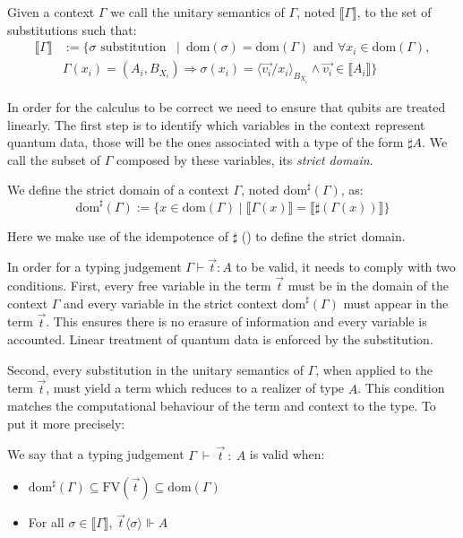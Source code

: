 \documentclass[runningheads,orivec,envcountsame,envcountsect]{llncs}
\newcommand\ansubst[2]{\ensuremath{\langle #1 \rangle_{#2}}}
\newcommand\dom[1]{\mathrm{dom}(#1)}
\newcommand\sdom[1]{\mathrm{dom}^{\sharp}(#1)}
\newcommand\FV[1]{\mathrm{FV}(#1)}
\def\sem#1{\llbracket#1\rrbracket}
\def\TYP#1#2#3{#1~{\vdash}~#2~{:}~#3}
\def\real{\Vdash}
\newcommand\basis[1]{\ensuremath{B_{ #1 }}}
\begin{document}
\begin{definition}
    Given a context $\Gamma$ we call the unitary semantics of $\Gamma$, noted $\sem{\Gamma}$, to the set of substitutions such that:
    \begin{align*}
      \sem{\Gamma} &:= 
      \{\sigma\text{ substitution }~\mid~ \dom{\sigma} = \dom{\Gamma}\text{ and } \forall {x_i} \in\dom{\Gamma},\\
      &\Gamma(x_i) = (A_i, \basis{X_i})\Rightarrow \sigma(x_i)=\ansubst{\vec{v_i}/x_i}{\basis{X_i}} \land \vec{v_i}\in\sem{A_i}\}
    \end{align*}
\end{definition}

In order for the calculus to be correct we need to ensure that qubits are treated linearly. The first step is to identify which variables in the context represent quantum data, those will be the ones associated with a type of the form $\sharp A$. We call the subset of $\Gamma$ composed by these variables, its \emph{strict domain}. 

\begin{definition}
    We define the strict domain of a context $\Gamma$, noted $\sdom{\Gamma}$, as:
    \[
    \sdom{\Gamma} := \{x\in\dom{\Gamma} \mid \sem{\Gamma(x)}=\sem{\sharp(\Gamma(x))}\}
    \]
\end{definition}

Here we make use of the idempotence of $\sharp$ () to define the strict domain. 

In order for a typing judgement $\Gamma\vdash \vec{t}: A$ to be valid, it needs to comply with two conditions. First, every free variable in the term $\vec{t}$ must be in the domain of the context $\Gamma$ and every variable in the strict context $\sdom{\Gamma}$ must appear in the term $\vec{t}$. This ensures there is no erasure of information and every variable is accounted. Linear treatment of quantum data is enforced by the substitution.

Second, every substitution in the unitary semantics of $\Gamma$, when applied to the term $\vec{t}$, must yield a term which reduces to a realizer of type $A$. This condition matches the computational behaviour of the term and context to the type. To put it more precisely: 

\begin{definition}
    We say that a typing judgement $\TYP{\Gamma}{\vec t}{A}$ is valid when:
    \begin{itemize}
        \item $\sdom{\Gamma}\subseteq\FV{\vec t}\subseteq \dom{\Gamma}$
        \item For all $\sigma\in\sem\Gamma$, $\vec{t}\ansubst{\sigma}{}\real A$
    \end{itemize}
\end{definition}
\end{document}
